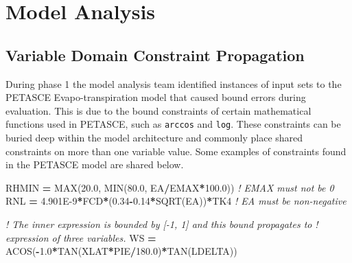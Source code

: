 \documentclass[article, 12pt, oneside]{memoir}
\newenvironment{Shaded}{}{}
\newcommand{\BuiltInTok}[1]{#1}
\newcommand{\CommentTok}[1]{\textcolor[rgb]{0.38,0.63,0.69}{\textit{#1}}}
\newcommand{\FloatTok}[1]{\textcolor[rgb]{0.25,0.63,0.44}{#1}}
\newcommand{\KeywordTok}[1]{\textcolor[rgb]{0.00,0.44,0.13}{\textbf{#1}}}
\newcommand{\NormalTok}[1]{#1}
\begin{document}
\hypertarget{model-analysis}{%
\section{Model Analysis}\label{model-analysis}}

\hypertarget{variable-domain-constraint-propagation}{%
\subsection{Variable Domain Constraint
Propagation}\label{variable-domain-constraint-propagation}}

During phase 1 the model analysis team identified instances of input
sets to the PETASCE Evapo-transpiration model that caused bound errors
during evaluation. This is due to the bound constraints of certain
mathematical functions used in PETASCE, such as \texttt{arccos} and
\texttt{log}. These constraints can be buried deep within the model
architecture and commonly place shared constraints on more than one
variable value. Some examples of constraints found in the PETASCE model
are shared below.

\begin{Shaded}
\begin{Highlighting}[]
\NormalTok{RHMIN }\KeywordTok{=} \BuiltInTok{MAX}\NormalTok{(}\FloatTok{20.0}\NormalTok{, }\BuiltInTok{MIN}\NormalTok{(}\FloatTok{80.0}\NormalTok{, EA}\KeywordTok{/}\NormalTok{EMAX}\KeywordTok{*}\FloatTok{100.0}\NormalTok{))   }\CommentTok{! EMAX must not be 0}
\NormalTok{RNL }\KeywordTok{=} \FloatTok{4.901E-9}\KeywordTok{*}\NormalTok{FCD}\KeywordTok{*}\NormalTok{(}\FloatTok{0.34}\KeywordTok{-}\FloatTok{0.14}\KeywordTok{*}\BuiltInTok{SQRT}\NormalTok{(EA))}\KeywordTok{*}\NormalTok{TK4   }\CommentTok{! EA must be non-negative}

\CommentTok{! The inner expression is bounded by [-1, 1] and this bound propagates to}
\CommentTok{! expression of three variables.}
\NormalTok{WS }\KeywordTok{=} \BuiltInTok{ACOS}\NormalTok{(}\KeywordTok{-}\FloatTok{1.0}\KeywordTok{*}\BuiltInTok{TAN}\NormalTok{(XLAT}\KeywordTok{*}\NormalTok{PIE}\KeywordTok{/}\FloatTok{180.0}\NormalTok{)}\KeywordTok{*}\BuiltInTok{TAN}\NormalTok{(LDELTA))}
\end{Highlighting}
\end{Shaded}
\end{document}
